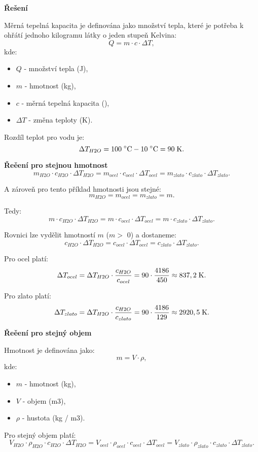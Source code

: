 \documentclass{article}
\begin{document}
\textbf{Řešení}

Měrná tepelná kapacita je definována jako množství tepla, které je potřeba k ohřátí jednoho kilogramu látky o jeden stupeň Kelvina:
\begin{equation}
    Q = m \cdot c \cdot \Delta T,
\end{equation}
kde:
\begin{itemize}
    \item $Q$ - množství tepla (J),
    \item $m$ - hmotnost (kg),
    \item $c$ - měrná tepelná kapacita (\ueqJandKGinvKinv),
    \item $\Delta T$ - změna teploty (K).
\end{itemize}

Rozdíl teplot pro vodu je:
$$
    \Delta T_{H2O} = 100 \; ^\circ \textrm{C} - 10 \; ^\circ \textrm{C} = 90 \; \textrm{K}.
$$

\textbf{Řeěení pro stejnou hmotnost}
$$
    m_{H2O} \cdot c_{H2O} \cdot \Delta T_{H2O} = m_{ocel} \cdot c_{ocel} \cdot \Delta T_{ocel} = m_{zlato} \cdot c_{zlato} \cdot \Delta T_{zlato}.
$$

A zároveň pro tento příklad hmotnosti jsou stejné:
$$
    m_{H2O} = m_{ocel} = m_{zlato} = m.
$$

Tedy:
$$
    m \cdot c_{H2O} \cdot \Delta T_{H2O} = m \cdot c_{ocel} \cdot \Delta T_{ocel} = m \cdot c_{zlato} \cdot \Delta T_{zlato}.
$$

Rovnici lze vydělit hmotností $m$ ($m >$ 0) a dostaneme:
$$
    c_{H2O} \cdot \Delta T_{H2O} = c_{ocel} \cdot \Delta T_{ocel} = c_{zlato} \cdot \Delta T_{zlato}.
$$

Pro ocel platí:
$$
    \Delta T_{ocel} = \Delta T_{H2O} \cdot \frac{c_{H2O}}{c_{ocel}} = 90 \cdot \frac{4 186}{450} \approx 837,2 \; \textrm{K}.
$$

Pro zlato platí:
$$
    \Delta T_{zlato} = \Delta T_{H2O} \cdot \frac{c_{H2O}}{c_{zlato}} = 90 \cdot \frac{4 186}{129} \approx 2 920,5 \; \textrm{K}.
$$

\textbf{Řeěení pro stejný objem}

Hmotnost je definována jako:
$$
    m = V \cdot \rho,
$$
kde:
\begin{itemize}
    \item $m$ - hmotnost (kg),
    \item $V$ - objem (m3),
    \item $\rho$ - hustota (kg / m3).
\end{itemize}

Pro stejný objem platí:
$$
    V_{H2O} \cdot \rho_{H2O} \cdot c_{H2O} \cdot \Delta T_{H2O} = V_{ocel} \cdot \rho_{ocel} \cdot c_{ocel} \cdot \Delta T_{ocel} = V_{zlato} \cdot \rho_{zlato} \cdot c_{zlato} \cdot \Delta T_{zlato}.
$$
\end{document}
